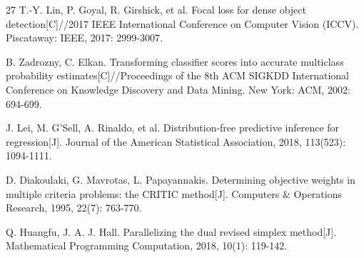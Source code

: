 \begin{thebibliography}{27}
T.-Y. Lin, P. Goyal, R. Girshick, et al. Focal loss for dense object detection[C]//2017 IEEE International Conference on Computer Vision (ICCV). Piscataway: IEEE, 2017: 2999-3007.

B. Zadrozny, C. Elkan. Transforming classifier scores into accurate multiclass probability estimates[C]//Proceedings of the 8th ACM SIGKDD International Conference on Knowledge Discovery and Data Mining. New York: ACM, 2002: 694-699.

J. Lei, M. G'Sell, A. Rinaldo, et al. Distribution-free predictive inference for regression[J]. Journal of the American Statistical Association, 2018, 113(523): 1094-1111.

D. Diakoulaki, G. Mavrotas, L. Papayannakis. Determining objective weights in multiple criteria problems: the CRITIC method[J]. Computers \& Operations Research, 1995, 22(7): 763-770.

Q. Huangfu, J. A. J. Hall. Parallelizing the dual revised simplex method[J]. Mathematical Programming Computation, 2018, 10(1): 119-142.

\end{thebibliography}
